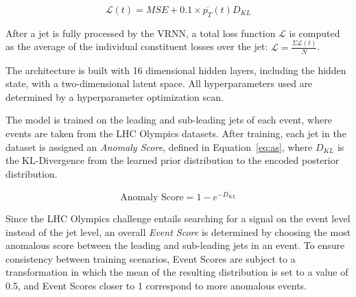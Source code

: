 \documentclass[letterpaper,11pt]{article}
\begin{document}
\begin{equation}
\label{eq:loss}
\mathcal{L}(t)=MSE+0.1 \times \overline{p_T}(t)D_{KL}
\end{equation}

After a jet is fully processed by the VRNN, a total loss function $\mathcal{L}$ is computed as the average of the individual constituent losses over the jet: $\mathcal{L} = \frac{\Sigma \mathcal{L}(t)}{N}$.

The architecture is built with 16 dimensional hidden layers, including the hidden state, with a two-dimensional latent space. All hyperparameters used are determined by a hyperparameter optimization scan. 

The model is trained on the leading and sub-leading jets of each event, where events are taken from the LHC Olympics datasets. 
After training, each jet in the dataset is assigned an \textit{Anomaly Score}, defined in Equation~\ref{eq:as}, where $D_{KL}$ is the KL-Divergence from the learned prior distribution to the encoded posterior distribution.

\begin{equation}
\label{eq:as}
\text{Anomaly Score} = 1 - e^{-\overline{D_{KL}}}
\end{equation}

Since the LHC Olympics challenge entails searching for a signal on the event level instead of the jet level, an overall \textit{Event Score} is determined by choosing the most anomalous score between the leading and sub-leading jets in an event. 
To ensure consistency between training scenarios, Event Scores are subject to a transformation in which the mean of the resulting distribution is set to a value of 0.5, and Event Scores closer to 1 correspond to more anomalous events. 
\end{document}
